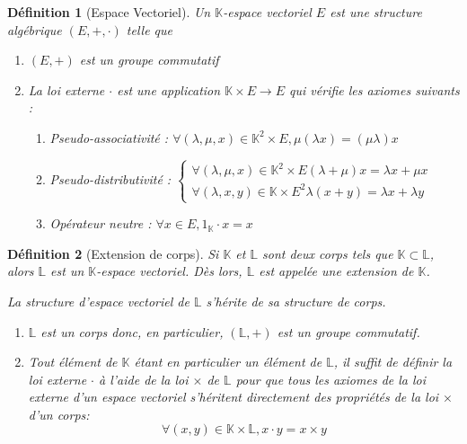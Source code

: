 \documentclass[a4paper,12pt,french]{report}
\newtheorem{definition}{Définition}[section]
\begin{document}
			
			\begin{definition}[Espace Vectoriel]
				Un \(\mathbb{K}\)-espace vectoriel \(E\)  est une structure algébrique \( (E, + , \cdot)\) telle que
				\begin{enumerate}
					\item \( (E, +) \) est un groupe commutatif
					\item La loi externe \( \cdot \) est une application \( \mathbb{K} \times E \longrightarrow E \) qui vérifie les axiomes suivants :
						\begin{enumerate}
							\item Pseudo-associativité :
								\(
								\forall (\lambda, \mu, x) \in \mathbb{K}^2 \times E, \mu(\lambda x) = (\mu \lambda) x
								\)
							\item Pseudo-distributivité :
								\(
								\left\{
									\begin{array}{ll}
										\forall (\lambda, \mu, x) \in \mathbb{K}^2 \times E (\lambda + \mu)x = \lambda x + \mu x \\
										\forall (\lambda, x, y) \in \mathbb{K} \times E^2 \lambda(x + y) = \lambda x + \lambda y
									\end{array}
								\right.
								\)
							\item Opérateur neutre :
								\(
								\forall x \in E, 1_\mathbb{K} \cdot x = x
								\)
						\end{enumerate}
				\end{enumerate}
				
			\end{definition}
			
			
			\begin{definition}[Extension de corps]
			
				Si \( \mathbb{K} \) et \( \mathbb{L} \) sont deux corps tels que \(\mathbb{K} \subset  \mathbb{L} \), alors
				\(\mathbb{L}\) est un \(\mathbb{K}\)-espace vectoriel. Dès lors, \(\mathbb{L}\) est appelée une \emph{extension} de \(\mathbb{K}\).
			
				\begin{preuve}
					La structure d'espace vectoriel de \(\mathbb{L}\) s'hérite de sa structure de corps.
					\begin{enumerate}
						\item \(\mathbb{L}\) est un corps donc, en particulier, \((\mathbb{L}, +)\) est un groupe commutatif.
						\item Tout élément de \(\mathbb{K}\) étant en particulier un élément de \(\mathbb{L}\), il suffit de définir la loi
						externe \(\cdot\) à l'aide de la loi \( \times \) de \(\mathbb{L}\) pour que tous les axiomes de la loi externe d'un espace vectoriel s'héritent directement des propriétés de la loi \( \times \) d'un corps:
							\[
							\forall (x, y) \in \mathbb{K} \times \mathbb{L}, x \cdot y = x \times y
							\]
					\end{enumerate}
				\end{preuve}
			\end{definition}
			
\end{document}
